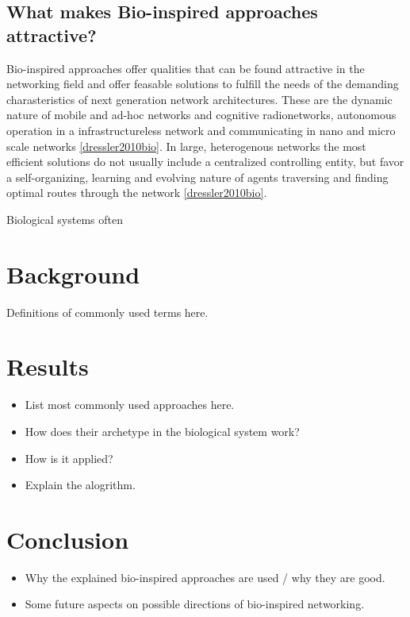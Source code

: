 \documentclass{IWORK2014}
\begin{document}
\subsection{What makes Bio-inspired approaches attractive?} 
Bio-inspired approaches offer qualities that can be found attractive in the networking field and offer feasable solutions to fulfill the needs of the demanding charasteristics of next generation network architectures. These are the dynamic nature of mobile and ad-hoc networks and cognitive radionetworks, autonomous operation in a infrastructureless network and communicating in nano and micro scale networks \ref{dressler2010bio}. In large, heterogenous networks the most efficient solutions do not usually include a centralized controlling entity, but favor a self-organizing, learning and evolving nature of agents traversing and finding optimal routes through the network \ref{dressler2010bio}.

Biological systems often 




\section{Background}
Definitions of commonly used terms here.

\section{Results}

\begin{itemize}
	\item List most commonly used approaches here.
	\item How does their archetype in the biological system work?
	\item How is it applied?
	\item Explain the alogrithm.
\end{itemize}

\section{Conclusion}
\begin{itemize}
	\item Why the explained bio-inspired approaches are used / why they are good.
	\item Some future aspects on possible directions of bio-inspired networking.
\end{itemize}




\end{document}
